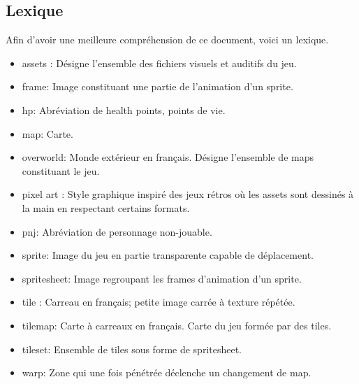 \documentclass[11pt]{article}
\begin{document}
\subsection{Lexique}
Afin d'avoir une meilleure compréhension de ce document, voici un lexique. \\
\begin{itemize}{}{}
\item assets : Désigne l'ensemble des fichiers visuels et auditifs du jeu.
\item frame: Image constituant une partie de l'animation d'un sprite.
\item hp: Abréviation de health points, points de vie.
\item map: Carte.
\item overworld: Monde extérieur en français. Désigne l'ensemble de maps constituant le jeu.
\item pixel art : Style graphique inspiré des jeux rétros où les assets sont dessinés à la main en respectant certains formats.
\item pnj: Abréviation de personnage non-jouable.
\item sprite: Image du jeu en partie transparente capable de déplacement.
\item spritesheet: Image regroupant les frames d'animation d'un sprite.
\item tile : Carreau en français; petite image carrée à texture répétée.
\item tilemap: Carte à carreaux en français. Carte du jeu formée par des tiles.
\item tileset: Ensemble de tiles sous forme de spritesheet.
\item warp: Zone qui une fois pénétrée déclenche un changement de map.
\end{itemize}
\end{document}
